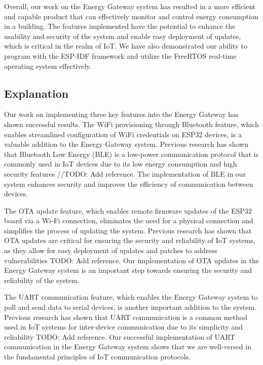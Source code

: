 Overall, our work on the Energy Gateway system has resulted in a more efficient and capable product that can effectively monitor and control energy consumption in a building. The features implemented have the potential to enhance the usability and security of the system and enable easy deployment of updates, which is critical in the realm of IoT. We have also demonstrated our ability to program with the ESP-IDF framework and utilize the FreeRTOS real-time operating system effectively.

\subsection{Explanation}
\label{sec:explanation}

Our work on implementing three key features into the Energy Gateway has shown successful results. The WiFi provisioning through Bluetooth feature, which enables streamlined configuration of WiFi credentials on ESP32 devices, is a valuable addition to the Energy Gateway system. Previous research has shown that Bluetooth Low Energy (BLE) is a low-power communication protocol that is commonly used in IoT devices due to its low energy consumption and high security features //TODO: Add reference. The implementation of BLE in our system enhances security and improves the efficiency of communication between devices.

The OTA update feature, which enables remote firmware updates of the ESP32 board via a Wi-Fi connection, eliminates the need for a physical connection and simplifies the process of updating the system. Previous research has shown that OTA updates are critical for ensuring the security and reliability of IoT systems, as they allow for easy deployment of updates and patches to address vulnerabilities TODO: Add reference. Our implementation of OTA updates in the Energy Gateway system is an important step towards ensuring the security and reliability of the system.

The UART communication feature, which enables the Energy Gateway system to poll and send data to serial devices, is another important addition to the system. Previous research has shown that UART communication is a common method used in IoT systems for inter-device communication due to its simplicity and reliability TODO: Add reference. Our successful implementation of UART communication in the Energy Gateway system shows that we are well-versed in the fundamental principles of IoT communication protocols.

